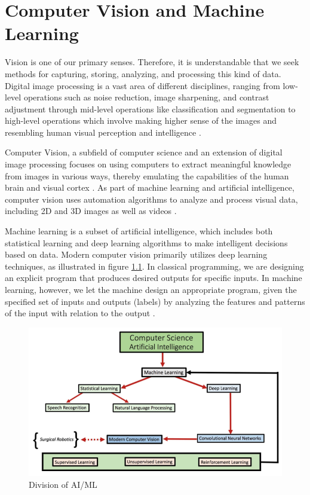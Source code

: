 \chapter{Computer Vision and Machine Learning}
Vision is one of our primary senses. Therefore, it is understandable that we seek methods for capturing, storing, analyzing, and processing this kind of data. Digital image processing is a vast area of different disciplines, ranging from low-level operations such as noise reduction, image sharpening, and contrast adjustment through mid-level operations like classification and segmentation to high-level operations which involve making higher sense of the images and resembling human visual perception and intelligence \cite{Gonzalez2018}. 

Computer Vision, a subfield of computer science and an extension of digital image processing focuses on using computers to extract meaningful knowledge from images in various ways, thereby emulating the capabilities of the human brain and visual cortex \cite{Gonzalez2018}. As part of machine learning and artificial intelligence, computer vision uses automation algorithms to analyze and process visual data, including 2D and 3D images as well as videos \cite{Szeliski2022, Atallah2020}.

Machine learning is a subset of artificial intelligence, which includes both statistical learning and deep learning algorithms to make intelligent decisions based on data. Modern computer vision primarily utilizes deep learning techniques, as illustrated in figure \ref{fig:ai-ml}. In classical programming, we are designing an explicit program that produces desired outputs for specific inputs. In machine learning, however, we let the machine design an appropriate program, given the specified set of inputs and outputs (labels) by analyzing the features and patterns of the input with relation to the output \cite{Alam2021}.

\begin{figure}[H]
\begin{centering}
\includegraphics[width=12cm]{assets/images/aiml.png}
\par\end{centering}
\caption{Division of AI/ML \cite{Atallah2020}}
\label{fig:ai-ml}
\end{figure}

